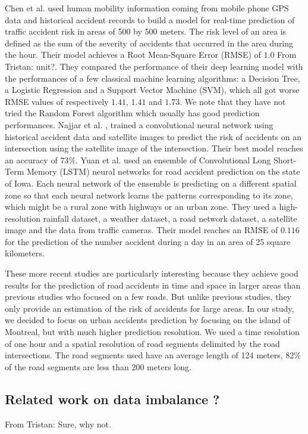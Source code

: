 \documentclass[conference]{IEEEtran}
\newcommand{\TG}[1]{\colorlet{saved}{.}\color{orange}From Tristan: #1\color{saved}}
\begin{document}
Chen et al. \cite{QChen2016} used human mobility information coming from
mobile phone GPS data and historical accident records to build a model for
real-time prediction of traffic accident risk in areas of 500 by 500
meters. The risk level of an area is defined as the sum of the severity of
accidents that occurred in the area during the hour. Their model achieves
a Root Mean-Square Error (RMSE) of $1.0$ \TG{unit?}. They compared the performance of their deep learning
model with the performances of a few classical machine learning
algorithms: a Decision Tree, a Logistic Regression and a Support Vector
Machine (SVM), which all got worse RMSE values of respectively $1.41$,
$1.41$ and $1.73$. We note that they have not tried the Random
Forest algorithm which usually has good prediction performances. Najjar et
al. \cite{Najjar2017}, trained a convolutional neural network using
historical accident data and satellite images to predict the risk of
accidents on an intersection using the satellite image of the intersection.
Their best model reaches an accuracy of $73\%$. Yuan et al. \cite{Yuan2018}
used an ensemble of Convolutional Long Short-Term Memory (LSTM) neural
networks for road accident prediction on the state of Iowa. Each neural
network of the ensemble is predicting on a different spatial zone so that
each neural network learns the patterns corresponding to its zone, which
might be a rural zone with highways or an urban zone. They used a
high-resolution rainfall dataset, a weather dataset, a road network
dataset, a satellite image and the data from traffic cameras. Their model
reaches an RMSE of $0.116$ for the prediction of the number accident during
a day in an area of 25 square kilometers.

These more recent studies are particularly interesting because they achieve
good results for the prediction of road accidents in time and space in
larger areas than previous studies who focused on a few roads. But unlike
previous studies, they only provide an estimation of the risk of accidents
for large areas. In our study, we decided to focus on urban accidents
prediction by focusing on the island of Montreal, but with much higher
prediction resolution. We used a time resolution of one hour and a spatial
resolution of road segments delimited by the road intersections. The road
segments used have an average length of 124 meters, $82\%$ of the road
segments are less than 200 meters long.

\subsection{Related work on data imbalance ?}
\TG{Sure, why not.}
\end{document}
